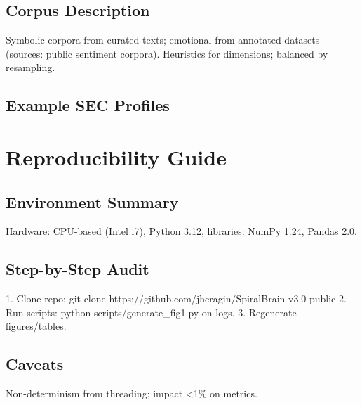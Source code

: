 \documentclass[11pt,a4paper]{article}
\begin{document}
\subsection{Corpus Description}
Symbolic corpora from curated texts; emotional from annotated datasets (sources: public sentiment corpora). Heuristics for dimensions; balanced by resampling.

\subsection{Example SEC Profiles}

\begin{table}[H]
\centering
\caption{Example SEC Vectors}
\renewcommand{\arraystretch}{1.25}
\end{table}

\section{Reproducibility Guide}
\label{app:repro}

\subsection{Environment Summary}
Hardware: CPU-based (Intel i7), Python 3.12, libraries: NumPy 1.24, Pandas 2.0.

\subsection{Step-by-Step Audit}
1. Clone repo: git clone https://github.com/jhcragin/SpiralBrain-v3.0-public
2. Run scripts: python scripts/generate\_fig1.py on logs.
3. Regenerate figures/tables.

\subsection{Caveats}
Non-determinism from threading; impact <1\% on metrics.
\end{document}
